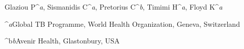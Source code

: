 Glaziou P^\textit{a}, Sismanidis C^\textit{a}, Pretorius C^\textit{b}, Timimi H^\textit{a}, Floyd K^\textit{a}

^\textit{a}Global TB Programme, World Health Organization, Geneva, Switzerland

^b\textit{b}Avenir Health, Glastonbury, USA